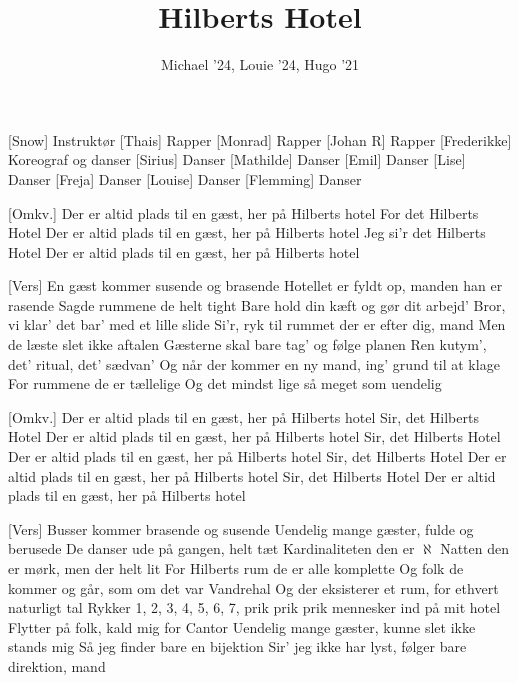 \documentclass[a4paper,11pt]{article}
\title{Hilberts Hotel}
\author{Michael '24, Louie '24, Hugo '21}
\begin{document}
\maketitle

\begin{roles}
[Snow] Instruktør
[Thais] Rapper
[Monrad] Rapper
[Johan R] Rapper
[Frederikke] Koreograf og danser
[Sirius] Danser
[Mathilde] Danser
[Emil] Danser
[Lise] Danser
[Freja] Danser
[Louise] Danser
[Flemming] Danser
\end{roles}


\begin{song}

[Omkv.] Der er altid plads til en gæst, her på Hilberts hotel
For det Hilberts Hotel
Der er altid plads til en gæst, her på Hilberts hotel
Jeg si'r det Hilberts Hotel
Der er altid plads til en gæst, her på Hilberts hotel

[Vers] En gæst kommer susende og brasende
Hotellet er fyldt op, manden han er rasende
Sagde rummene de helt tight
Bare hold din kæft og gør dit arbejd'
Bror, vi klar' det bar' med et lille slide
Si'r, ryk til rummet der er efter dig, mand
Men de læste slet ikke aftalen
Gæsterne skal bare tag' og følge planen
Ren kutym', det' ritual, det' sædvan'
Og når der kommer en ny mand, ing' grund til at klage
For rummene de er tællelige
Og det mindst lige så meget som uendelig

[Omkv.] Der er altid plads til en gæst, her på Hilberts hotel
Sir, det Hilberts Hotel
Der er altid plads til en gæst, her på Hilberts hotel
Sir, det Hilberts Hotel
Der er altid plads til en gæst, her på Hilberts hotel
Sir, det Hilberts Hotel
Der er altid plads til en gæst, her på Hilberts hotel
Sir, det Hilberts Hotel
Der er altid plads til en gæst, her på Hilberts hotel

[Vers] Busser kommer brasende og susende
Uendelig mange gæster, fulde og berusede
De danser ude på gangen, helt tæt
Kardinaliteten den er $\aleph$ 
Natten den er mørk, men der helt lit
For Hilberts rum de er alle komplette
Og folk de kommer og går, som om det var 
Vandrehal
Og der eksisterer et rum, for ethvert naturligt tal
Rykker 1, 2, 3, 4, 5, 6, 7, 
prik prik prik mennesker ind på mit hotel
Flytter på folk, kald mig for Cantor
Uendelig mange gæster, kunne slet ikke stands mig
Så jeg finder bare en bijektion
Sir' jeg ikke har lyst, følger bare direktion, mand
\end{song}
\end{document}
